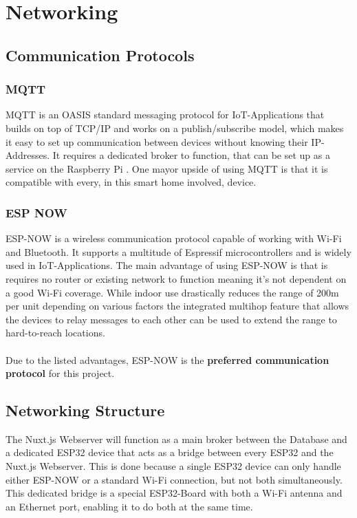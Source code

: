\chapter{Networking}
\section{Communication Protocols}
    \subsection{MQTT}
    MQTT is an OASIS standard messaging protocol for 
    IoT-Applications that builds on top of TCP/IP and 
    works on a publish/subscribe model, which makes it easy
    to set up communication between devices without knowing
    their IP-Addresses. It requires a dedicated broker to
    function, that can be set up as a service on the 
    Raspberry Pi \cite{mqtt_nodate}.
    One mayor upside of using MQTT is that it is compatible
    with every, in this smart home involved, device.


    \subsection{ESP NOW} 
    ESP-NOW is a wireless communication protocol capable of
    working with Wi-Fi and Bluetooth. It supports a 
    multitude of Espressif microcontrollers and is widely 
    used in IoT-Applications. The main advantage of using
    ESP-NOW is that is requires no router or existing
    network to function meaning it's not dependent on
    a good Wi-Fi coverage. While indoor use drastically
    reduces the range of 200m per unit depending on various
    factors \cite{esp-now-reach_2024} 
    the integrated multihop feature that allows the devices 
    to relay messages to each other can be used to extend 
    the range to hard-to-reach locations.\\~\\
    Due to the listed advantages, ESP-NOW is the \textbf{preferred
    communication protocol} for this project.

\section{Networking Structure}
The Nuxt.js Webserver will function as a main broker between
the Database and a dedicated ESP32 device that  acts
as a bridge between every ESP32 and the Nuxt.js Webserver.
This is done because a single ESP32 device can only handle
either ESP-NOW or a standard Wi-Fi connection, but not both
simultaneously. This dedicated bridge is a special 
ESP32-Board with both a Wi-Fi antenna and an Ethernet port,
enabling it to do both at the same time. 


